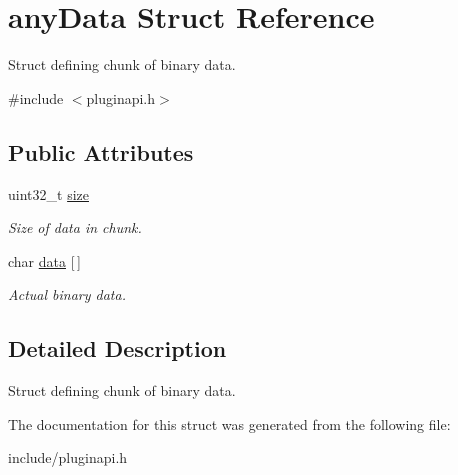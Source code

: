 \hypertarget{structanyData}{\section{any\-Data \-Struct \-Reference}
\label{structanyData}
}


\-Struct defining chunk of binary data.  




{\ttfamily \#include $<$pluginapi.\-h$>$}

\subsection*{\-Public \-Attributes}
\begin{DoxyCompactItemize}
\item 
\hypertarget{structanyData_a9ec123dcd4ba6d92ec18377762961829}{uint32\-\_\-t \hyperlink{structanyData_a9ec123dcd4ba6d92ec18377762961829}{size}}\label{structanyData_a9ec123dcd4ba6d92ec18377762961829}

\begin{DoxyCompactList}\small\item\em \-Size of data in chunk. \end{DoxyCompactList}\item 
\hypertarget{structanyData_a473ff7eb137517427b0da6ffa871f572}{char \hyperlink{structanyData_a473ff7eb137517427b0da6ffa871f572}{data} \mbox{[}$\,$\mbox{]}}\label{structanyData_a473ff7eb137517427b0da6ffa871f572}

\begin{DoxyCompactList}\small\item\em \-Actual binary data. \end{DoxyCompactList}\end{DoxyCompactItemize}


\subsection{\-Detailed \-Description}
\-Struct defining chunk of binary data. 

\-The documentation for this struct was generated from the following file\-:\begin{DoxyCompactItemize}
\item 
include/pluginapi.\-h\end{DoxyCompactItemize}
